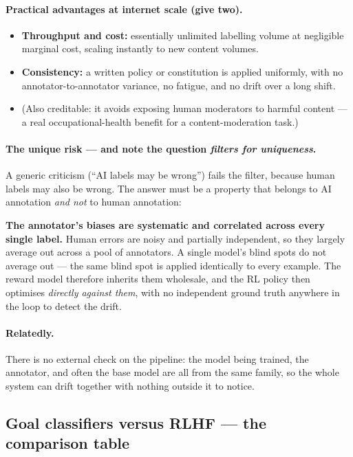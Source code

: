 \documentclass[11pt,a4paper]{article}
\begin{document}
\paragraph{Practical advantages at internet scale (give two).}
\begin{itemize}
\item \textbf{Throughput and cost:} essentially unlimited labelling volume at
negligible marginal cost, scaling instantly to new content volumes.
\item \textbf{Consistency:} a written policy or constitution is applied
uniformly, with no annotator-to-annotator variance, no fatigue, and no drift
over a long shift.
\item (Also creditable: it avoids exposing human moderators to harmful
content --- a real occupational-health benefit for a content-moderation task.)
\end{itemize}

\paragraph{The unique risk --- and note the question \emph{filters for
uniqueness}.} A generic criticism (``AI labels may be wrong'') fails the
filter, because human labels may also be wrong. The answer must be a property
that belongs to AI annotation \emph{and not} to human annotation:

\medskip
\noindent\textbf{The annotator's biases are systematic and correlated across
every single label.} Human errors are noisy and partially independent, so
they largely average out across a pool of annotators. A single model's blind
spots do not average out --- the same blind spot is applied identically to
every example. The reward model therefore inherits them wholesale, and the RL
policy then optimises \emph{directly against them}, with no independent ground
truth anywhere in the loop to detect the drift.

\paragraph{Relatedly.} There is no external check on the pipeline: the model
being trained, the annotator, and often the base model are all from the same
family, so the whole system can drift together with nothing outside it to
notice.

\subsection{Goal classifiers versus RLHF --- the comparison table}
\end{document}
